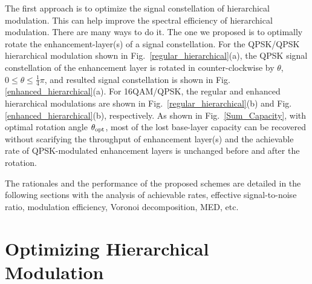 \documentclass[10pt,fleqn, twocolumn]{IEEEtran}
\begin{document}
The first approach is to optimize the signal constellation of
hierarchical modulation. This can help improve the spectral
efficiency of hierarchical modulation. There are many ways to do
it. The one we proposed is to optimally rotate the
enhancement-layer(s) of a signal constellation. For the QPSK/QPSK
hierarchical modulation shown in
Fig.~\ref{regular_hierarchical}(a), the QPSK signal constellation
of the enhancement layer is rotated in counter-clockwise by
$\theta$, $0\leq\theta\leq\frac{1}{4}\pi$, and resulted signal
constellation is shown in Fig. \ref{enhanced_hierarchical}(a). For
16QAM/QPSK, the regular and enhanced hierarchical modulations are
shown in Fig.~\ref{regular_hierarchical}(b) and Fig.
\ref{enhanced_hierarchical}(b), respectively.  As shown in
Fig.~\ref{Sum_Capacity}, with optimal rotation angle $\theta_{\rm
opt}$, most of the lost base-layer capacity can be recovered
without scarifying the throughput of enhancement layer(s) and the
achievable rate of QPSK-modulated enhancement layers is unchanged
before and after the rotation.
\begin{figure}
\end{figure}



The rationales and the performance of the proposed schemes are
detailed in the following sections with the analysis of achievable
rates, effective signal-to-noise ratio, modulation efficiency,
Voronoi decomposition, MED, etc.

\section{Optimizing Hierarchical Modulation}
\end{document}
